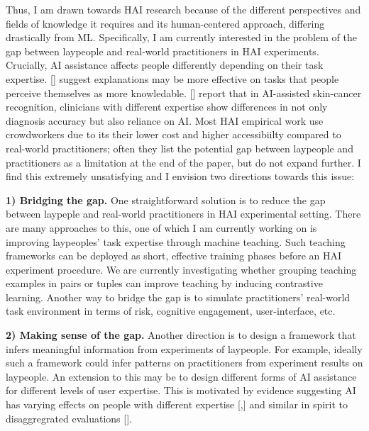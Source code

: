 


Thus, I am drawn towards HAI research because of the different perspectives and fields of knowledge it requires and its human-centered approach, differing drastically from ML. 
Specifically, I am currently interested in the problem of the gap between laypeople and real-world practitioners in HAI experiments.
Crucially, AI assistance affects people differently depending on their task expertise. [] suggest explanations may be more effective on tasks that people perceive themselves as more knowledable. [] report that in AI-assisted skin-cancer recognition, clinicians with different expertise show differences in not only diagnosis accuracy but also reliance on AI. 
Most HAI empirical work use crowdworkers due to its their lower cost and higher accessibiilty compared to real-world practitioners; 
often they list the potential gap between laypeople and practitioners as a limitation at the end of the paper, but do not expand further. 
I find this extremely unsatisfying and I envision two directions towards this issue:

\noindent \textbf{1) Bridging the gap.}
One straightforward solution is to reduce the gap between laypeple and real-world practitioners in HAI experimental setting. 
There are many approaches to this, one of which I am currently working on is improving laypeoples' task expertise through machine teaching. 
Such teaching frameworks can be deployed as short, effective training phases before an HAI experiment procedure. 
We are currently investigating whether grouping teaching examples in pairs or tuples can improve teaching by inducing contrastive learning.
Another way to bridge the gap is to simulate practitioners' real-world task environment in terms of risk, cognitive engagement, user-interface, etc.


\noindent \textbf{2) Making sense of the gap.}
Another direction is to design a framework that infers meaningful information from experiments of laypeople. 
For example, ideally such a framework could infer patterns on practitioners from experiment results on laypeople.
An extension to this may be to design different forms of AI assistance for different levels of user expertise. 
This is motivated by evidence suggesting AI has varying effects on people with different expertise [,] and similar in spirit to disaggregrated evaluations [].




